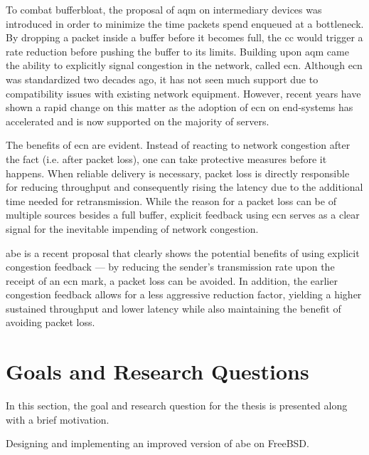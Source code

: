 To combat bufferbloat, the proposal of \gls{aqm} on intermediary devices was introduced in order to minimize the time packets spend enqueued at a bottleneck. By dropping a packet inside a buffer before it becomes full, the \gls{cc} would trigger a rate reduction before pushing the buffer to its limits. Building upon \gls{aqm} came the ability to explicitly signal congestion in the network, called \gls{ecn}. Although \gls{ecn} was standardized two decades ago, it has not seen much support due to compatibility issues with existing network equipment. However, recent years have shown a rapid change on this matter as the adoption of \gls{ecn} on end-systems has accelerated and is now supported on the majority of servers. \cite{enabling_internet-wide_ecn}

The benefits of \gls{ecn} are evident. Instead of reacting to network congestion after the fact (i.e. after packet loss), one can take protective  measures before it happens. When reliable delivery is necessary, packet loss is directly responsible for reducing throughput and consequently rising the latency due to the additional time needed for retransmission. While the reason for a packet loss can be of multiple sources besides a full buffer, explicit feedback using \gls{ecn} serves as a clear signal for the inevitable impending of network congestion.

\gls{abe} \cite{abe} is a recent proposal  that clearly shows the potential  benefits of using explicit congestion feedback --- by reducing the sender's transmission rate upon the receipt of an \gls{ecn} mark, a packet loss can be avoided. In addition, the earlier congestion feedback allows for a less aggressive reduction factor, yielding a higher sustained throughput and lower latency while also maintaining the benefit of avoiding packet loss.









\section{Goals and Research Questions} \label{goals_and_research_questions}

In this section, the goal and research question for the thesis is presented along with a brief motivation.

\begin{statement}
    Designing and implementing an improved version of \gls{abe} on FreeBSD.
\end{statement}

